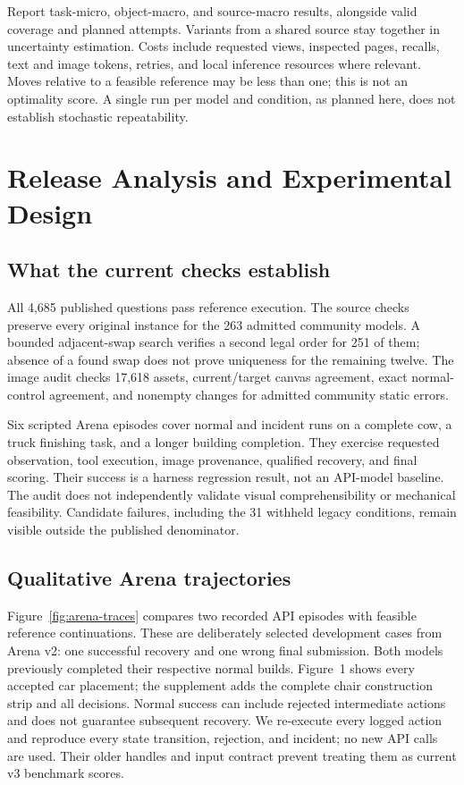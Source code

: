\documentclass[10pt,twocolumn,letterpaper]{article}
\begin{document}
Report task-micro, object-macro, and source-macro results, alongside valid coverage and planned attempts. Variants from a shared source stay together in uncertainty estimation. Costs include requested views, inspected pages, recalls, text and image tokens, retries, and local inference resources where relevant. Moves relative to a feasible reference may be less than one; this is not an optimality score. A single run per model and condition, as planned here, does not establish stochastic repeatability.

\section{Release Analysis and Experimental Design}
\subsection{What the current checks establish}
All 4,685 published questions pass reference execution. The source checks preserve every original instance for the 263 admitted community models. A bounded adjacent-swap search verifies a second legal order for 251 of them; absence of a found swap does not prove uniqueness for the remaining twelve. The image audit checks 17,618 assets, current/target canvas agreement, exact normal-control agreement, and nonempty changes for admitted community static errors.

Six scripted Arena episodes cover normal and incident runs on a complete cow, a truck finishing task, and a longer building completion. They exercise requested observation, tool execution, image provenance, qualified recovery, and final scoring. Their success is a harness regression result, not an API-model baseline. The audit does not independently validate visual comprehensibility or mechanical feasibility. Candidate failures, including the 31 withheld legacy conditions, remain visible outside the published denominator.



\subsection{Qualitative Arena trajectories}
\label{sec:traces}
Figure~\ref{fig:arena-traces} compares two recorded API episodes with feasible reference continuations. These are deliberately selected development cases from Arena v2: one successful recovery and one wrong final submission. Both models previously completed their respective normal builds. Figure~1 shows every accepted car placement; the supplement adds the complete chair construction strip and all decisions. Normal success can include rejected intermediate actions and does not guarantee subsequent recovery. We re-execute every logged action and reproduce every state transition, rejection, and incident; no new API calls are used. Their older handles and input contract prevent treating them as current v3 benchmark scores.
\end{document}
